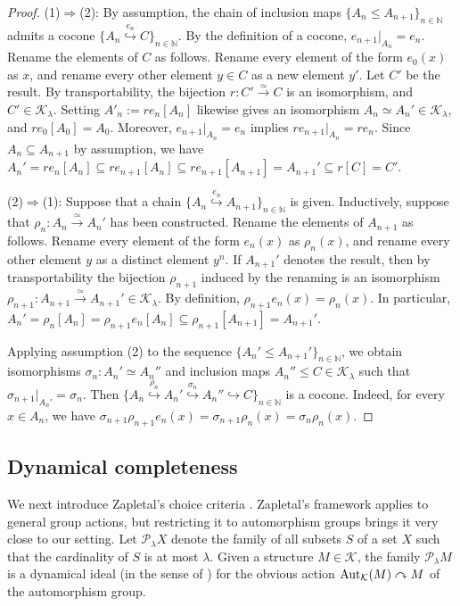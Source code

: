 \documentclass[10pt]{amsart}
\numberwithin{equation}{section}
\theoremstyle{plain}
\theoremstyle{definition}
\newcommand{\N}{\mathbb{N}}
\newcommand{\K}{\mathcal{K}}
\newcommand{\embed}{\hookrightarrow}
\newcommand{\edge}[1]{\overset{#1}{\longrightarrow}}
\newcommand{\embedge}[1]{\overset{#1}{\embed}}
\newcommand{\acts}{\curvearrowright}
\begin{document}
\begin{proof}
(1)$\Rightarrow$(2):
By assumption, the chain of inclusion maps $\{A_n\leq A_{n+1}\}_{n\in\N}$ admits a cocone $\{A_n\embedge{e_n}C\}_{n\in\N}$.
By the definition of a cocone, $e_{n+1}|_{A_n}=e_n$.
Rename the elements of $C$ as follows.
Rename every element of the form $e_0(x)$ as $x$, and rename every other element $y\in C$ as a new element $y'$.
Let $C'$ be the result. By transportability, the bijection $r\colon C'\edge{\simeq}C$ is an isomorphism, and $C'\in\K_\lambda$.
Setting $A'_n:=r e_n[A_n]$ likewise gives an isomorphism $A_n\simeq A_n'\in\K_\lambda$, and $re_0[A_0]=A_0$.
Moreover, $e_{n+1}|_{A_n}=e_n$ implies $re_{n+1}|_{A_n}=re_n$.
Since $A_n\subseteq A_{n+1}$ by assumption, we have $A_n'=re_n[A_n]\subseteq re_{n+1}[A_n]\subseteq re_{n+1}[A_{n+1}]=A_{n+1}'\subseteq r[C]=C'$.


(2)$\Rightarrow$(1):
Suppose that a chain $\{A_n\embedge{e_n}A_{n+1}\}_{n\in\N}$ is given.
Inductively, suppose that $\rho_n\colon A_n\edge{\simeq}A_n'$ has been constructed.
Rename the elements of $A_{n+1}$ as follows.
Rename every element of the form $e_n(x)$ as $\rho_n(x)$, and rename every other element $y$ as a distinct element $y^n$.
If $A_{n+1}'$ denotes the result, then by transportability the bijection $\rho_{n+1}$ induced by the renaming is an isomorphism $\rho_{n+1}\colon A_{n+1}\edge{\simeq} A_{n+1}'\in\K_\lambda$.
By definition, $\rho_{n+1}e_n(x)=\rho_n(x)$.
In particular, $A_n'=\rho_n[A_n]=\rho_{n+1}e_n[A_n]\subseteq\rho_{n+1}[A_{n+1}]=A_{n+1}'$.

Applying assumption (2) to the sequence $\{A_n'\leq A_{n+1}'\}_{n\in\N}$, we obtain isomorphisms $\sigma_n\colon A_n'\simeq A_n''$ and inclusion maps $A_n''\leq C\in\K_\lambda$ such that $\sigma_{n+1}|_{A_n'}=\sigma_n$.
Then $\{A_n\embedge{\rho_n}A_n'\embedge{\sigma_n}A_n''\embed C\}_{n\in\N}$ is a cocone.
Indeed, for every $x\in A_n$, we have $\sigma_{n+1}\rho_{n+1} e_{n}(x)=\sigma_{n+1}\rho_n(x)=\sigma_{n}\rho_n(x)$.
\end{proof}


\subsection{Dynamical completeness}

We next introduce Zapletal's choice criteria \cite{Zap26}.
Zapletal's framework applies to general group actions, but restricting it to automorphism groups brings it very close to our setting.
Let $\mathcal{P}_\lambda X$ denote the family of all subsets $S$ of a set $X$ such that the cardinality of $S$ is at most $\lambda$.
Given a structure $M\in\K$, the family $\mathcal{P}_\lambda M$ is a dynamical ideal (in the sense of \cite{Zap26}) for the obvious action ${\rm Aut}_\K(M)\acts M$ of the automorphism group.
\end{document}
